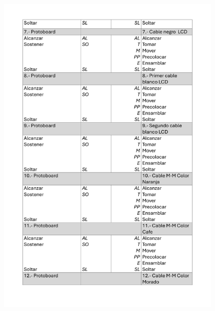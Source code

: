     \begin{figure}[H]
        \centering
        \includegraphics[scale=0.25]{30/img/diagramaBimanualEnsamble-2.pdf}
    \end{figure}
